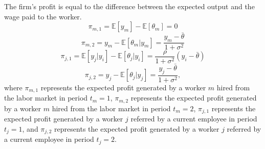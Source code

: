 \documentclass[12pt]{article}
\begin{document}

The firm's profit is equal to the difference between the expected output and the wage paid to the worker.
\begin{equation}\label{eq_pi_m_1}
    \pi_{m,1} = \mathbb{E}[y_m]-\mathbb{E}[\theta_m] = 0
\end{equation}
\begin{equation}\label{eq_pi_m_2}
    \pi_{m,2} = y_m - \mathbb{E}[\theta_m|y_m] = \frac{y_m-\bar{\theta}}{1+\sigma^2}
\end{equation}
\begin{equation}\label{eq_pi_j_1}
    \pi_{j,1} = \mathbb{E}[y_j|y_i]-\mathbb{E}[\theta_j|y_i] = \frac{\rho}{1+\sigma^2}(y_i-\bar{\theta})
\end{equation}
\begin{equation}\label{eq_pi_j_2}
    \pi_{j,2} = y_j - \mathbb{E}[\theta_j|y_j] = \frac{y_j-\bar{\theta}}{1+\sigma^2},
\end{equation}
where $\pi_{m,1}$ represents the expected profit generated by a worker $m$ hired from the labor market in period $t_m = 1$, $\pi_{m,2}$ represents the expected profit generated by a worker $m$ hired from the labor market in period $t_m = 2$, $\pi_{j,1}$ represents the expected profit generated by a worker $j$ referred by a current employee in period $t_j = 1$, and $\pi_{j,2}$ represents the expected profit generated by a worker $j$ referred by a current employee in period $t_j = 2$.
\end{document}
